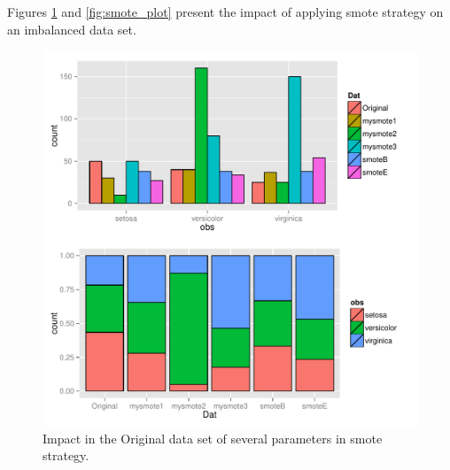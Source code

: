 \documentclass[10pt,a4paper]{article}\usepackage[]{graphicx}\usepackage[]{color}
\makeatletter
\def\maxwidth{ %
  \ifdim\Gin@nat@width>\linewidth
    \linewidth
  \else
    \Gin@nat@width
  \fi
}
\newenvironment{knitrout}{}{} %
\makeatother
\begin{document}
Figures \ref{fig:smote_plot_hist} and \ref{fig:smote_plot} present the impact of applying smote strategy on an imbalanced data set.

\begin{knitrout}\footnotesize
{}\color{fgcolor}\begin{figure}

{\centering \includegraphics[width=\maxwidth,height=0.5\textheight]{figures/UBL-smote_plot_hist-1} 

}

\caption[Impact in the Original data set of several parameters in smote strategy]{Impact in the Original data set of several parameters in smote strategy. }\label{fig:smote_plot_hist}
\end{figure}


\end{knitrout}
\end{document}
